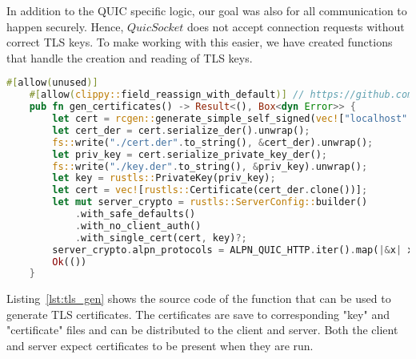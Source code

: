 In addition to the QUIC specific logic, our goal was also for all communication to happen securely.
Hence, $QuicSocket$ does not accept connection requests without correct TLS keys.
To make working with this easier, we have created functions that handle the creation and reading of TLS keys.

\newpage

\begin{lstlisting}[language=Rust, caption={The $gen\_certificates$ function that can be used to generate appropriate TLS certificates.}, label=lst:tls_gen]
    #[allow(unused)]
    #[allow(clippy::field_reassign_with_default)] // https://github.com/rust-lang/rust-clippy/issues/6527
    pub fn gen_certificates() -> Result<(), Box<dyn Error>> {
        let cert = rcgen::generate_simple_self_signed(vec!["localhost".into()]).unwrap();
        let cert_der = cert.serialize_der().unwrap();
        fs::write("./cert.der".to_string(), &cert_der).unwrap();
        let priv_key = cert.serialize_private_key_der();
        fs::write("./key.der".to_string(), &priv_key).unwrap();
        let key = rustls::PrivateKey(priv_key);
        let cert = vec![rustls::Certificate(cert_der.clone())];
        let mut server_crypto = rustls::ServerConfig::builder()
            .with_safe_defaults()
            .with_no_client_auth()
            .with_single_cert(cert, key)?;
        server_crypto.alpn_protocols = ALPN_QUIC_HTTP.iter().map(|&x| x.into()).collect();
        Ok(())
    }
\end{lstlisting}

Listing~\ref{lst:tls_gen} shows the source code of the function that can be used to generate TLS certificates.
The certificates are save to corresponding "key" and "certificate" files and can be distributed to the client and server.
Both the client and server expect certificates to be present when they are run.

